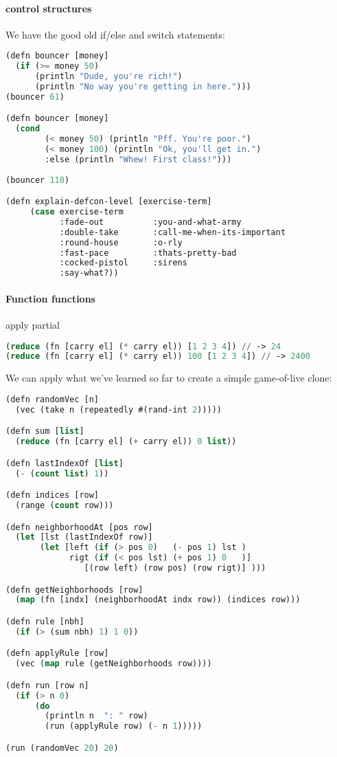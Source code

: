 \paragraph{control structures} We have the good old if/else and switch statements: 
\begin{lstlisting}[language=lisp]
(defn bouncer [money]
  (if (>= money 50) 
      (println "Dude, you're rich!")
      (println "No way you're getting in here.")))
(bouncer 61)

(defn bouncer [money]
  (cond 
        (< money 50) (println "Pff. You're poor.")
        (< money 100) (println "Ok, you'll get in.")
        :else (println "Whew! First class!")))
      
(bouncer 110)

(defn explain-defcon-level [exercise-term]
     (case exercise-term
           :fade-out          :you-and-what-army
           :double-take       :call-me-when-its-important
           :round-house       :o-rly
           :fast-pace         :thats-pretty-bad
           :cocked-pistol     :sirens
           :say-what?))
\end{lstlisting}

\paragraph{Function functions}
apply
partial
\begin{lstlisting}[language=lisp]
(reduce (fn [carry el] (* carry el)) [1 2 3 4]) // -> 24
(reduce (fn [carry el] (* carry el)) 100 [1 2 3 4]) // -> 2400
\end{lstlisting}


We can apply what we've learned so far to create a simple game-of-live clone: 
\begin{lstlisting}[language=lisp]
(defn randomVec [n]
  (vec (take n (repeatedly #(rand-int 2)))))

(defn sum [list]
  (reduce (fn [carry el] (+ carry el)) 0 list))

(defn lastIndexOf [list] 
  (- (count list) 1))

(defn indices [row]
  (range (count row)))

(defn neighborhoodAt [pos row] 
  (let [lst (lastIndexOf row)]
       (let [left (if (> pos 0)   (- pos 1) lst )
             rigt (if (< pos lst) (+ pos 1) 0   )]
                [(row left) (row pos) (row rigt)] )))

(defn getNeighborhoods [row] 
  (map (fn [indx] (neighborhoodAt indx row)) (indices row)))

(defn rule [nbh]
  (if (> (sum nbh) 1) 1 0))

(defn applyRule [row]
  (vec (map rule (getNeighborhoods row))))

(defn run [row n]
  (if (> n 0) 
      (do
        (println n  ": " row)
        (run (applyRule row) (- n 1)))))

(run (randomVec 20) 20)
\end{lstlisting}


